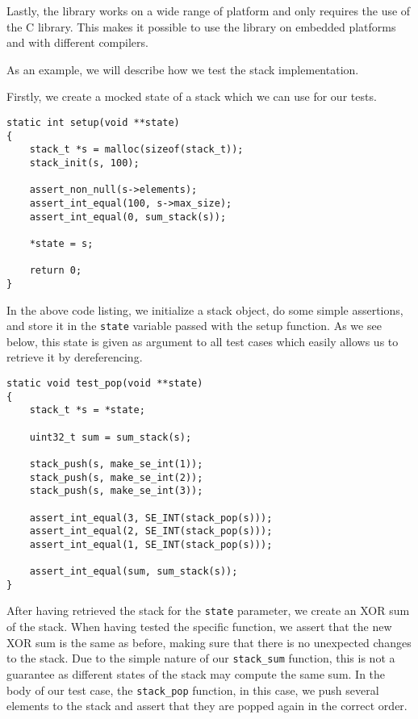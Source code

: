Lastly, the library works on a wide range of platform and only requires the use
of the C library. This makes it possible to use the library on embedded
platforms and with different compilers.

As an example, we will describe how we test the stack implementation.

Firstly, we create a mocked state of a stack which we can use for our tests.
\begin{lstlisting}[language={[ANSI]C},caption={Unit-test setup procedure}]
static int setup(void **state)
{
    stack_t *s = malloc(sizeof(stack_t));
    stack_init(s, 100);

    assert_non_null(s->elements);
    assert_int_equal(100, s->max_size);
    assert_int_equal(0, sum_stack(s));

    *state = s;

    return 0;
}
\end{lstlisting}

In the above code listing, we initialize a stack object, do some
simple assertions, and store it in the {\tt state} variable passed
with the setup function. As we see below, this state is given as
argument to all test cases which easily allows us to retrieve it by
dereferencing.
\begin{lstlisting}[language={[ANSI]C},caption={Unit-test of {\tt stack\_pop}}]
static void test_pop(void **state)
{
    stack_t *s = *state;

    uint32_t sum = sum_stack(s);

    stack_push(s, make_se_int(1));
    stack_push(s, make_se_int(2));
    stack_push(s, make_se_int(3));

    assert_int_equal(3, SE_INT(stack_pop(s)));
    assert_int_equal(2, SE_INT(stack_pop(s)));
    assert_int_equal(1, SE_INT(stack_pop(s)));

    assert_int_equal(sum, sum_stack(s));
}
\end{lstlisting}

After having retrieved the stack for the {\tt state} parameter, we create an XOR
sum of the stack. When having tested the specific function, we assert that the
new XOR sum is the same as before, making sure that there is no unexpected
changes to the stack. Due to the simple nature of our {\tt stack\_sum} function,
this is not a guarantee as different states of the stack may compute the same
sum. %
In the body of our test case, the {\tt stack\_pop} function, in this case, we
push several elements to the stack and assert that they are popped again in the
correct order.

